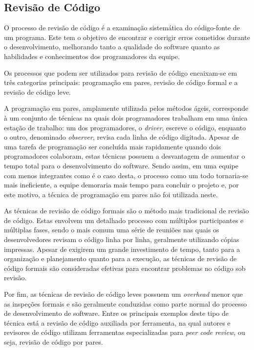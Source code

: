 \subsection{Revisão de Código}


O processo de revisão de código é a examinação sistemática do código-fonte de um programa.
Este tem o objetivo de encontrar e corrigir erros cometidos durante o desenvolvimento, melhorando tanto a qualidade do software quanto as habilidades e conhecimentos dos programadores da equipe.

Os processos que podem ser utilizados para revisão de código encaixam-se em três categorias principais: programação em pares, revisão de código formal e a revisão de código leve.

A programação em pares, amplamente utilizada pelos métodos ágeis, corresponde à um conjunto de técnicas na quais dois programadores trabalham em uma única estação de trabalho: um dos programadores, o \emph{driver}, escreve o código, enquanto o outro, denominado \emph{observer}, revisa cada linha de código digitada.
Apesar de uma tarefa de programação ser concluída mais rapidamente quando dois programadores colaboram, estas técnicas possuem a desvantagem de aumentar o tempo total para o desenvolvimento do software. %
Sendo assim, em uma equipe com menos integrantes como é o caso desta, o processo como um todo tornaria-se mais ineficiente, a equipe demoraria mais tempo para concluir o projeto e, por este motivo, a técnica de programação em pares não foi utilizada neste.

As técnicas de revisão de código formais são o método mais tradicional de revisão de código.
Estas envolvem um detalhado processo com múltiplos participantes e múltiplas fases, sendo o mais comum uma série de reuniões nas quais os desenvolvedores revisam o código linha por linha, geralmente utilizando cópias impressas.
Apesar de exigirem um grande investimento de tempo, tanto para a organização e planejamento quanto para a execução, as técnicas de revisão de código formais são consideradas efetivas para encontrar problemas no código sob revisão.

Por fim, as técnicas de revisão de código leves possuem um \emph{overhead} menor que as inspeções formais e são geralmente conduzidas como parte normal do processo de desenvolvimento de software.
Entre os principais exemplos deste tipo de técnica está a revisão de código auxiliada por ferramenta, na qual autores e revisores de código utilizam ferramentas especializadas para \emph{peer code review}, ou seja, revisão de código por pares.

